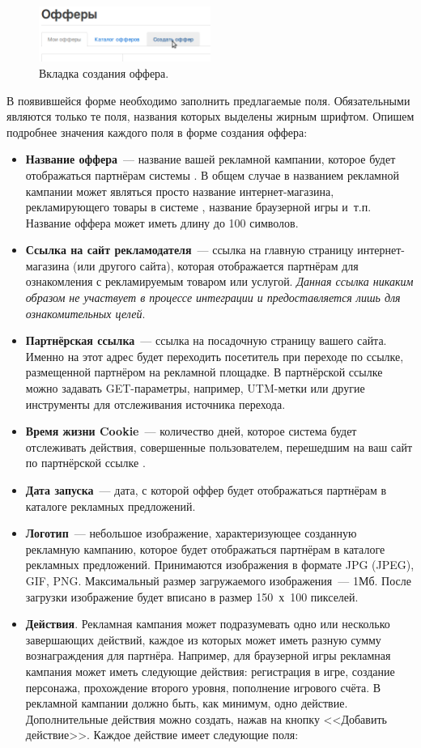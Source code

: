 \documentclass[a4paper,12pt]{article}
\begin{document}
\begin{figure}[!ht]
\centering
\includegraphics[width=0.5\textwidth]{include/create-offer.png}
\caption{Вкладка создания оффера.}
\label{fig:create-offer}
\end{figure}

В появившейся форме необходимо заполнить предлагаемые поля. Обязательными являются только те поля, названия которых выделены жирным шрифтом. Опишем подробнее значения каждого поля в форме создания оффера:

\begin{itemize}
\item \textbf{Название оффера}~--- название вашей рекламной кампании, которое будет отображаться партнёрам системы \heymoose. В общем случае в названием рекламной кампании может являться просто название интернет-магазина, рекламирующего товары в системе \heymoose{}, название браузерной игры и~т.п. Название оффера может иметь длину до 100 символов.
\item \textbf{Ссылка на сайт рекламодателя}~--- ссылка на главную страницу интернет-магазина (или другого сайта), которая отображается партнёрам для ознакомления с рекламируемым товаром или услугой. \textit{Данная ссылка никаким образом не участвует в процессе интеграции и предоставляется лишь для ознакомительных целей}.
\item \textbf{Партнёрская ссылка}~--- ссылка на посадочную страницу вашего сайта. Именно на этот адрес будет переходить посетитель при переходе по ссылке, размещенной партнёром на рекламной площадке. В партнёрской ссылке можно задавать GET-параметры, например, UTM-метки или другие инструменты для отслеживания источника перехода.
\item \textbf{Время жизни Cookie}~--- количество дней, которое система \heymoose{} будет отслеживать действия, совершенные пользователем, перешедшим на ваш сайт по партнёрской ссылке \heymoose.
\item \textbf{Дата запуска}~--- дата, с которой оффер будет отображаться партнёрам в каталоге рекламных предложений.
\item \textbf{Логотип}~--- небольшое изображение, характеризующее созданную рекламную кампанию, которое будет отображаться партнёрам в каталоге рекламных предложений. Принимаются изображения в формате JPG (JPEG), GIF, PNG. Максимальный размер загружаемого изображения~--- 1Мб. После загрузки изображение будет вписано в размер 150~х~100 пикселей.
\item \textbf{Действия}. Рекламная кампания может подразумевать одно или несколько завершающих действий, каждое из которых может иметь разную сумму вознаграждения для партнёра. Например, для браузерной игры рекламная кампания может иметь следующие действия: регистрация в игре, создание персонажа, прохождение второго уровня, пополнение игрового счёта. В рекламной кампании должно быть, как минимум, одно действие. Дополнительные действия можно создать, нажав на кнопку <<Добавить действие>>. Каждое действие имеет следующие поля:


\end{itemize}
\end{document}
